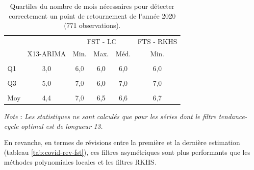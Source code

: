 \documentclass[
  11pt,
  french,
  a4paper]{article}
\newcommand\1{\mathds{1}}
\begin{document}
\begin{table}[!h]

\caption{\label{tab:covid-tp-fst}Quartiles du nombre de mois nécessaires pour détecter correctement un point de retournement de l'année 2020 (771 observations).}
\centering
\begin{tabular}[t]{lccccc}
\toprule
\multicolumn{2}{c}{ } & \multicolumn{3}{c}{FST - LC} & \multicolumn{1}{c}{FTS - RKHS} \\
\cmidrule(l{3pt}r{3pt}){3-5} \cmidrule(l{3pt}r{3pt}){6-6}
  & X13-ARIMA & Min. & Max. & Méd. & Min.\\
\midrule
\cellcolor{gray!6}{Min} & \cellcolor{gray!6}{2,0} & \cellcolor{gray!6}{2,0} & \cellcolor{gray!6}{2,0} & \cellcolor{gray!6}{2,0} & \cellcolor{gray!6}{2,0}\\
Q1 & 3,0 & 6,0 & 6,0 & 6,0 & 6,0\\
\cellcolor{gray!6}{Méd.} & \cellcolor{gray!6}{4,0} & \cellcolor{gray!6}{7,0} & \cellcolor{gray!6}{6,0} & \cellcolor{gray!6}{6,0} & \cellcolor{gray!6}{6,0}\\
Q3 & 5,0 & 7,0 & 6,0 & 7,0 & 7,0\\
\cellcolor{gray!6}{Max} & \cellcolor{gray!6}{14,0} & \cellcolor{gray!6}{14,0} & \cellcolor{gray!6}{14,0} & \cellcolor{gray!6}{14,0} & \cellcolor{gray!6}{14,0}\\
\addlinespace
Moy & 4,4 & 7,0 & 6,5 & 6,6 & 6,7\\
\bottomrule
\end{tabular}
\footnotesize


\emph{Note} : \emph{Les statistiques ne sont calculés que pour les séries dont le filtre tendance-cycle optimal est de longueur 13.}
\normalsize\end{table}

En revanche, en termes de révisions entre la première et la dernière estimation (tableau \ref{tab:covid-rev-fst}), ces filtres asymétriques sont plus performants que les méthodes polynomiales locales et les filtres RKHS.
\end{document}
